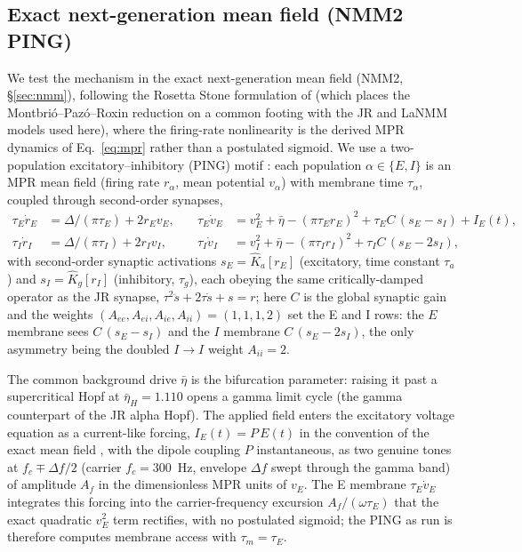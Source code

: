 \documentclass[11pt,a4paper]{article}
\providecommand{\DIFdeltex}[1]{{\protect\color{red} \scriptsize #1}} %
\providecommand{\DIFaddbegin}{} %
\providecommand{\DIFaddend}{} %
\providecommand{\DIFdelbegin}{} %
\providecommand{\DIFdelend}{} %
\providecommand{\DIFdel}[1]{\texorpdfstring{\DIFdeltex{#1}}{}} %
\begin{document}
\subsection{Exact next-generation mean field (NMM2 PING)}
We test the mechanism in the exact next-generation mean field (NMM2, \S\ref{sec:nmm}),
following the Rosetta Stone formulation of \cite{ruffini2025rosetta} (which places the
Montbri\'o--Paz\'o--Roxin reduction \cite{montbrio2015} on a common footing with the JR
and LaNMM models used here), where the firing-rate nonlinearity is the derived MPR
dynamics of Eq.~\eqref{eq:mpr} rather than a postulated sigmoid. We use a two-population
excitatory--inhibitory (PING) motif \cite{ruffini2021nmm2,clusella2023,ruffini2025rosetta}:
each population $\alpha\in\{E,I\}$ is an MPR mean field (firing rate $r_\alpha$, mean
potential $v_\alpha$) with membrane time $\tau_\alpha$, coupled through second-order
synapses,
\begin{equation}
\begin{aligned}
\tau_E\dot r_E&=\Delta/(\pi\tau_E)+2r_Ev_E, &\quad
\tau_E\dot v_E&=v_E^2+\bar\eta-(\pi\tau_E r_E)^2+\tau_E C\,(s_E-s_I)+I_E(t),\\[2pt]
\tau_I\dot r_I&=\Delta/(\pi\tau_I)+2r_Iv_I, &\quad
\tau_I\dot v_I&=v_I^2+\bar\eta-(\pi\tau_I r_I)^2+\tau_I C\,(s_E-2s_I),
\end{aligned}
\label{eq:nmm2-ping}
\end{equation}
with second-order synaptic activations $s_E=\hat K_a[r_E]$ (excitatory, time constant
$\tau_a$) and $s_I=\hat K_g[r_I]$ (inhibitory, $\tau_g$), each obeying the same
critically-damped operator as the JR synapse, $\tau^2\ddot s+2\tau\dot s+s=r$; here $C$
is the global synaptic gain and the weights $(A_{ee},A_{ei},A_{ie},A_{ii})=(1,1,1,2)$
set the E and I rows: the $E$ membrane sees $C\,(s_E-s_I)$ and the $I$ membrane
$C\,(s_E-2s_I)$, the only asymmetry being the doubled $I\!\to\!I$ weight $A_{ii}=2$.
\DIFaddbegin 

\DIFaddend The common background drive $\bar\eta$ is the bifurcation parameter: raising it
past a supercritical Hopf at $\bar\eta_H=1.110$ opens a gamma limit cycle (the gamma
counterpart of the JR alpha Hopf). The applied field enters the excitatory voltage equation
as a current-like forcing, $I_E(t)=P\,E(t)$ in the convention of the exact mean field
\cite{ruffini2021nmm2}, with the dipole coupling $P$ instantaneous, as two genuine tones at
$f_c\mp\Delta f/2$ (carrier $f_c=300$~Hz, envelope $\Delta f$ swept through the gamma band)
of amplitude $A_f$ in the dimensionless MPR units of $v_E$. The E membrane $\tau_E\dot v_E$
integrates this forcing into the carrier-frequency excursion $A_f/(\omega\tau_E)$ that the
exact quadratic $v_E^2$ term rectifies, with no postulated sigmoid; the PING as run
\DIFdelbegin \DIFdel{is
}\DIFdelend therefore computes membrane access with $\tau_m=\tau_E$.
\DIFaddbegin 
\end{document}
